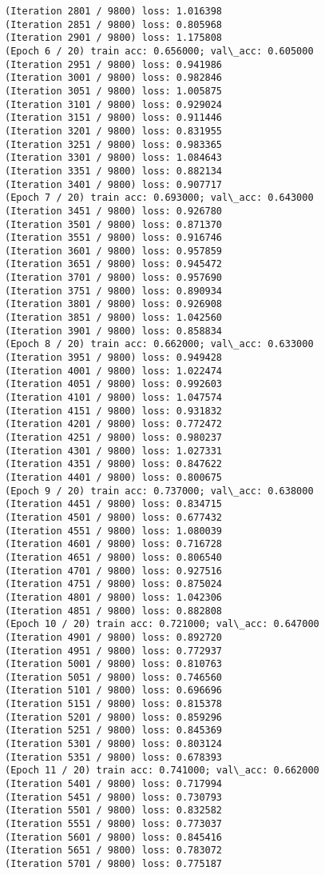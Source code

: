 \documentclass[11pt]{article}
\begin{document}
\begin{Verbatim}[commandchars=\\\{\}]
(Iteration 2801 / 9800) loss: 1.016398
(Iteration 2851 / 9800) loss: 0.805968
(Iteration 2901 / 9800) loss: 1.175808
(Epoch 6 / 20) train acc: 0.656000; val\_acc: 0.605000
(Iteration 2951 / 9800) loss: 0.941986
(Iteration 3001 / 9800) loss: 0.982846
(Iteration 3051 / 9800) loss: 1.005875
(Iteration 3101 / 9800) loss: 0.929024
(Iteration 3151 / 9800) loss: 0.911446
(Iteration 3201 / 9800) loss: 0.831955
(Iteration 3251 / 9800) loss: 0.983365
(Iteration 3301 / 9800) loss: 1.084643
(Iteration 3351 / 9800) loss: 0.882134
(Iteration 3401 / 9800) loss: 0.907717
(Epoch 7 / 20) train acc: 0.693000; val\_acc: 0.643000
(Iteration 3451 / 9800) loss: 0.926780
(Iteration 3501 / 9800) loss: 0.871370
(Iteration 3551 / 9800) loss: 0.916746
(Iteration 3601 / 9800) loss: 0.957859
(Iteration 3651 / 9800) loss: 0.945472
(Iteration 3701 / 9800) loss: 0.957690
(Iteration 3751 / 9800) loss: 0.890934
(Iteration 3801 / 9800) loss: 0.926908
(Iteration 3851 / 9800) loss: 1.042560
(Iteration 3901 / 9800) loss: 0.858834
(Epoch 8 / 20) train acc: 0.662000; val\_acc: 0.633000
(Iteration 3951 / 9800) loss: 0.949428
(Iteration 4001 / 9800) loss: 1.022474
(Iteration 4051 / 9800) loss: 0.992603
(Iteration 4101 / 9800) loss: 1.047574
(Iteration 4151 / 9800) loss: 0.931832
(Iteration 4201 / 9800) loss: 0.772472
(Iteration 4251 / 9800) loss: 0.980237
(Iteration 4301 / 9800) loss: 1.027331
(Iteration 4351 / 9800) loss: 0.847622
(Iteration 4401 / 9800) loss: 0.800675
(Epoch 9 / 20) train acc: 0.737000; val\_acc: 0.638000
(Iteration 4451 / 9800) loss: 0.834715
(Iteration 4501 / 9800) loss: 0.677432
(Iteration 4551 / 9800) loss: 1.080039
(Iteration 4601 / 9800) loss: 0.716728
(Iteration 4651 / 9800) loss: 0.806540
(Iteration 4701 / 9800) loss: 0.927516
(Iteration 4751 / 9800) loss: 0.875024
(Iteration 4801 / 9800) loss: 1.042306
(Iteration 4851 / 9800) loss: 0.882808
(Epoch 10 / 20) train acc: 0.721000; val\_acc: 0.647000
(Iteration 4901 / 9800) loss: 0.892720
(Iteration 4951 / 9800) loss: 0.772937
(Iteration 5001 / 9800) loss: 0.810763
(Iteration 5051 / 9800) loss: 0.746560
(Iteration 5101 / 9800) loss: 0.696696
(Iteration 5151 / 9800) loss: 0.815378
(Iteration 5201 / 9800) loss: 0.859296
(Iteration 5251 / 9800) loss: 0.845369
(Iteration 5301 / 9800) loss: 0.803124
(Iteration 5351 / 9800) loss: 0.678393
(Epoch 11 / 20) train acc: 0.741000; val\_acc: 0.662000
(Iteration 5401 / 9800) loss: 0.717994
(Iteration 5451 / 9800) loss: 0.730793
(Iteration 5501 / 9800) loss: 0.832582
(Iteration 5551 / 9800) loss: 0.773037
(Iteration 5601 / 9800) loss: 0.845416
(Iteration 5651 / 9800) loss: 0.783072
(Iteration 5701 / 9800) loss: 0.775187

\end{Verbatim}
\end{document}
